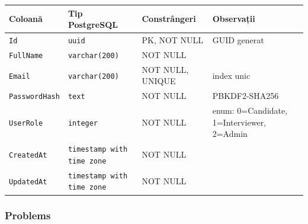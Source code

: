 \begin{tabular}{llll}
\hline
\textbf{Coloană} & \textbf{Tip PostgreSQL} & \textbf{Constrângeri} & \textbf{Observații} \\
\hline
\texttt{Id}           & \texttt{uuid}                  & PK, NOT NULL         & GUID generat \\
\texttt{FullName}     & \texttt{varchar(200)}          & NOT NULL             & \\
\texttt{Email}        & \texttt{varchar(200)}          & NOT NULL, UNIQUE     & index unic \\
\texttt{PasswordHash} & \texttt{text}                  & NOT NULL             & PBKDF2-SHA256 \\
\texttt{UserRole}     & \texttt{integer}               & NOT NULL             & enum: 0=Candidate, 1=Interviewer, 2=Admin \\
\texttt{CreatedAt}    & \texttt{timestamp with time zone} & NOT NULL          & \\
\texttt{UpdatedAt}    & \texttt{timestamp with time zone} & NOT NULL          & \\
\hline
\end{tabular}

\subsubsection{Problems}

